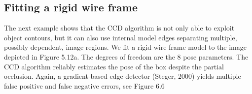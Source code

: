 \subsection{Fitting a rigid wire frame}
\label{sec:fdo}

The next example shows that the CCD algorithm is not only able to exploit object contours,
but it can also use internal model edges separating multiple, possibly dependent, image regions.
We fit a rigid wire frame model to the image depicted in Figure 5.12a. The degrees of freedom
are the 8 pose parameters. The CCD algorithm reliably estimates the pose of the box despite
the partial occlusion. Again, a gradient-based edge detector (Steger, 2000) yields multiple false
positive and false negative errors, see Figure 6.6

\begin{figure} 
  \begin{minipage}[t]{0.45\linewidth} 
    \centering  
  \end{minipage}%
  \begin{minipage}[t]{0.45\linewidth} 
    \centering 
  \end{minipage} 
  \begin{minipage}[t]{0.45\linewidth} 
    \centering 

\end{minipage}
\end{figure}
